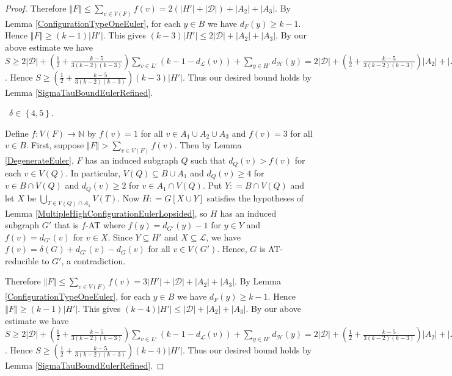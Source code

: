 \documentclass[12pt]{article}
\theoremstyle{plain}
\theoremstyle{definition}
\theoremstyle{remark}
\newcommand{\fancy}[1]{\mathcal{#1}}
\newcommand{\IN}{\mathbb{N}}
\newcommand{\D}{\fancy{D}}
\renewcommand{\L}{\fancy{L}}
\newcommand{\HH}{\fancy{H}}
\newcommand{\set}[1]{\left\{ #1 \right\}}
\newcommand{\card}[1]{\left|#1\right|}
\newcommand{\size}[1]{\left\Vert#1\right\Vert}
\newcommand{\func}[3]{#1\colon #2 \rightarrow #3}
\newcommand{\parens}[1]{\left( #1 \right)}
\newcommand{\DefinedAs}{\mathrel{\mathop:}=}
\def\D{\fancy{D}}
\newcommand{\case}[2]{{\bf Case #1.}~{\it #2}~~}
\begin{document}
\begin{proof}
Therefore $\size{F} \leq \sum_{v \in V(F)} f(v) = 2(\card{H'} + \card{\D}) + \card{A_2} + 
\card{A_3}$. By Lemma \ref{ConfigurationTypeOneEuler}, for each $y \in B$ we have $d_F(y) \ge k-1$.  Hence $\size{F} \ge (k-1)\card{H'}$.  This gives $(k-3)\card{H'} \leq 2\card{\D} + \card{A_2} + 
\card{A_3}$.  By our above estimate we have $S \ge  2|\D| + \parens{\frac12 + \frac{k-5}{3(k-2)(k-3)}}\sum_{v \in L'} (k-1-d_{\L}(v)) + \sum_{y \in H'} d_{\HH}(y) = 2\card{\D} + \parens{\frac12 + \frac{k-5}{3(k-2)(k-3)}}\card{A_2} + \card{A_3} \ge \parens{\frac12 + \frac{k-5}{3(k-2)(k-3)}}(2\card{\D} + \card{A_2} + \card{A_3})$.  Hence $S \ge \parens{\frac12 + \frac{k-5}{3(k-2)(k-3)}}(k-3)\card{H'}$.  Thus our desired bound holds by Lemma \ref{SigmaTauBoundEulerRefined}.
\bigskip

\noindent \case{2}{$\delta \in \set{4,5}$.}
\smallskip

Define $\func{f}{V(F)}{\IN}$ by $f(v) = 1$ for all $v \in A_1 \cup A_2 \cup A_3$ and $f(v) = 3$ for all $v \in B$.  First, suppose $\size{F} > \sum_{v \in V(F)} f(v)$.  Then by Lemma \ref{DegenerateEuler}, $F$ has an induced subgraph $Q$ such that $d_Q(v) > f(v)$ for each $v \in V(Q)$.  In particular, $V(Q) \subseteq B \cup A_1$ and $d_Q(v) \ge 4$ for $v \in B \cap V(Q)$ and $d_Q(v) \ge 2$ for $v \in A_1 \cap V(Q)$.  Put $Y \DefinedAs B \cap V(Q)$ and let $X$ be $\bigcup_{T \in V(Q) \cap A_1} V(T)$. Now $H \DefinedAs G[X \cup Y]$ satisfies the hypotheses of Lemma \ref{MultipleHighConfigurationEulerLopsided}, so $H$ has an induced subgraph $G'$ that is $f$-AT where $f(y) = d_{G'}(y) - 1$ for $y \in Y$ and $f(v) = d_{G'}(v)$ for $v \in X$.  Since $Y \subseteq H'$ and $X \subseteq \L$, we have $f(v) = \delta(G) + d_{G'}(v) - d_G(v)$ for all $v \in V(G')$.  Hence, $G$ is AT-reducible to $G'$, a contradiction.

Therefore $\size{F} \leq \sum_{v \in V(F)} f(v) = 3\card{H'} + \card{\D} + \card{A_2} + 
\card{A_3}$. By Lemma \ref{ConfigurationTypeOneEuler}, for each $y \in B$ we have $d_F(y) \ge k-1$.  Hence $\size{F} \ge (k-1)\card{H'}$.  This gives $(k-4)\card{H'} \leq \card{\D} + \card{A_2} + 
\card{A_3}$.  By our above estimate we have $S \ge 2|\D| + \parens{\frac12 + \frac{k-5}{3(k-2)(k-3)}}\sum_{v \in L'} (k-1-d_{\L}(v))  + \sum_{y \in H'} d_{\HH}(y) = 2\card{\D} + \parens{\frac12 + \frac{k-5}{3(k-2)(k-3)}}\card{A_2} + \card{A_3} \ge \parens{\frac12 + \frac{k-5}{3(k-2)(k-3)}}(\card{\D} + \card{A_2} + \card{A_3})$.  Hence $S \ge \parens{\frac12 + \frac{k-5}{3(k-2)(k-3)}}(k-4)\card{H'}$.  Thus our desired bound holds by Lemma \ref{SigmaTauBoundEulerRefined}.
\end{proof}



\end{document}
